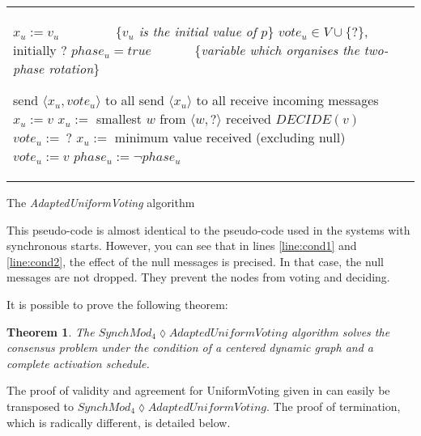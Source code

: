 \documentclass{article}
\newtheorem{theorem}{Theorem}
\begin{document}
\begin{algorithm}[htb]
\begin{distribalgo}[1]
\begin{tabular}{ll}
\begin{minipage}{33em}


\INDENT{\textbf{Initialisation:}}
	\STATE $x_u := v_u$ ~~~~~~~~\{\emph{$v_u$ is the initial value of $p$}\}
	\STATE $vote_u \in V\cup\{ ? \}$, initially $?$
	\STATE $phase_u = true$ ~~~~~~\{\textit{variable which organises the two-phase rotation}\}

\ENDINDENT
\BLANK

\INDENT{\textbf{Round $r$:}}
	\IF{$phase_u$}
		\STATE send $\langle x_u , vote_u \rangle$ to all
	\ELSE
		\STATE send $\langle x_u \rangle$ to all
	\ENDIF
	\STATE receive incoming messages
	\IF{$phase_u$}
		\IF{a node voted for $v$}
			\STATE $x_u:= v$ \label{line:adopt_vote}
		\ELSE
			\STATE $x_u :=$ smallest  $w$ from  $\langle w , ? \rangle$ received \label{line:min_vote}
		\ENDIF
		\IF{every node voted for $v$, none sent null} \label{line:cond1}
			\STATE $DECIDE(v)$
		\ENDIF
		\STATE $vote_u :=\ ?$
	\ELSE
		\STATE $ x_u :=$ minimum value received (excluding null) \label{line:min_val}
		\IF{every node sent $v$, none sent null} \label{line:cond2}
			\STATE $vote_u := v$
		\ENDIF
	\ENDIF
	\STATE $phase_u := \neg phase_u$
\ENDINDENT

\end{minipage}
\end{tabular}

\caption{The {\em AdaptedUniformVoting} algorithm}
\label{unifvotfig}
\end{distribalgo}
\end{algorithm}

This pseudo-code is almost identical to the pseudo-code used in the systems with synchronous starts.
However, you can see that in lines \ref{line:cond1} and \ref{line:cond2}, the effect of the null messages is precised.
In that case, the null messages are not dropped. They prevent the nodes from voting and deciding.

It is possible to prove the following theorem:

\begin{theorem}
	The $SynchMod_4 \lozenge AdaptedUniformVoting$ algorithm solves the consensus problem under the condition of a centered dynamic graph and a complete activation schedule.
\end{theorem}

The proof of validity and agreement for UniformVoting given in \cite{model_ho} can easily be transposed to \newline $SynchMod_4 \lozenge AdaptedUniformVoting$.
The proof of termination, which is radically different, is detailed below.
\end{document}
